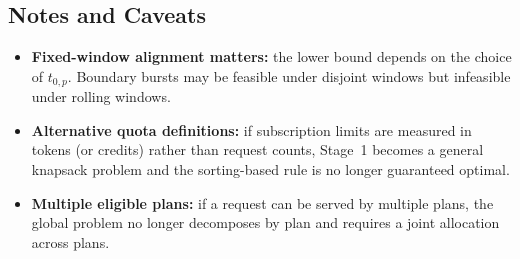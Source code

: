 \documentclass[11pt]{article}
\begin{document}
\subsection{Notes and Caveats}
\begin{itemize}
  \item \textbf{Fixed-window alignment matters:} the lower bound depends on the choice of \(t_{0,p}\). Boundary bursts may be feasible under disjoint windows but infeasible under rolling windows.
  \item \textbf{Alternative quota definitions:} if subscription limits are measured in tokens (or credits) rather than request counts, Stage~1 becomes a general knapsack problem and the sorting-based rule is no longer guaranteed optimal.
  \item \textbf{Multiple eligible plans:} if a request can be served by multiple plans, the global problem no longer decomposes by plan and requires a joint allocation across plans.
\end{itemize}
\end{document}
